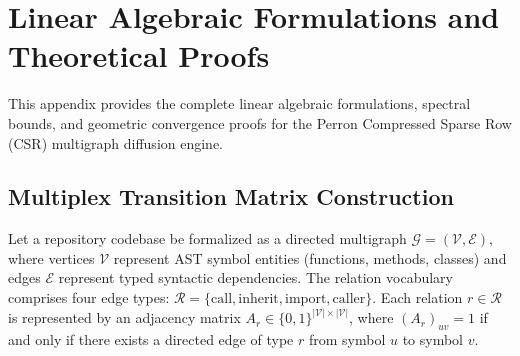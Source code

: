 \documentclass[10pt]{article}
\begin{document}
\clearpage
\appendix


\section{Linear Algebraic Formulations and Theoretical Proofs}
\label{app:spectral_proofs}

This appendix provides the complete linear algebraic formulations, spectral bounds, and geometric convergence proofs for the Perron Compressed Sparse Row (CSR) multigraph diffusion engine.

\subsection{Multiplex Transition Matrix Construction}
\label{prop:multiplex_construction}
Let a repository codebase be formalized as a directed multigraph $\mathcal{G} = (\mathcal{V}, \mathcal{E})$, where vertices $\mathcal{V}$ represent AST symbol entities (functions, methods, classes) and edges $\mathcal{E}$ represent typed syntactic dependencies. The relation vocabulary comprises four edge types: $\mathcal{R} = \{\text{call}, \text{inherit}, \text{import}, \text{caller}\}$. Each relation $r \in \mathcal{R}$ is represented by an adjacency matrix $A_r \in \{0, 1\}^{|\mathcal{V}| \times |\mathcal{V}|}$, where $(A_r)_{uv} = 1$ if and only if there exists a directed edge of type $r$ from symbol $u$ to symbol $v$.
\end{document}
